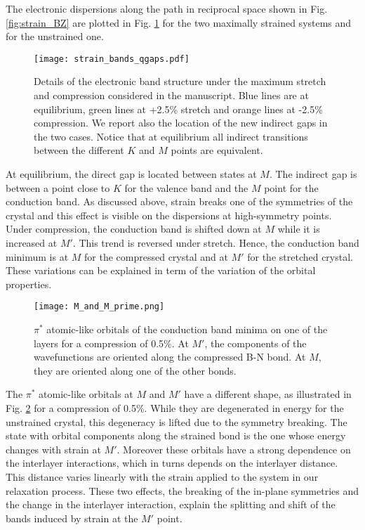 The electronic dispersions along the path in reciprocal space shown in Fig. \ref{fig:strain_BZ} are plotted in Fig. \ref{fig:strain_eldisp} for the two maximally strained systems and for the unstrained one. 
\begin{figure}[tb]
	\vspace{0.5cm}
	\setcapindent{2em}
	\centering
	\texttt{[image: strain\_bands\_qgaps.pdf]}
	\caption{Details of the electronic band structure under the maximum
	stretch and compression considered in the manuscript. Blue lines are at equilibrium, green lines at +2.5\% stretch and orange lines at -2.5\% compression. We report also the location of the new indirect gaps in the two cases. Notice that at equilibrium all indirect transitions between the different $K$ and $M$ points are equivalent.}
	\label{fig:strain_eldisp}
\end{figure}
At equilibrium, the direct gap is located between states at $M$. The indirect gap is between a point close to $K$ for the valence band and the $M$ point for the conduction band. As discussed above, strain breaks one of the symmetries of the crystal and this effect is visible on the dispersions at high-symmetry points. Under compression, the conduction band is shifted down at $M$ while it is increased at $M'$. This trend is reversed under stretch. Hence, the conduction band minimum is at $M$ for the compressed crystal and at $M'$ for the stretched crystal. 
These variations can be explained in term of the variation of the orbital properties. 
\begin{figure}[h!b]
	\vspace{-16pt}
	\setcapindent{1em}
	\centering
	\texttt{[image: M\_and\_M\_prime.png]}
	\caption{$\pi^*$ atomic-like orbitals of the conduction band minima on one of the layers for a compression of 0.5\%. At $M'$, the components of the wavefunctions are oriented along the compressed B-N bond. At $M$, they are oriented along one of the other bonds.}
	\label{fig:WF_strain}
\end{figure}
The $\pi^*$ atomic-like orbitals at $M$ and $M'$ have a different shape, as illustrated in Fig. \ref{fig:WF_strain} for a compression of 0.5\%. While they are degenerated in energy for the unstrained crystal, this degeneracy is lifted due to the symmetry breaking. The state with orbital components along the strained bond is the one whose energy changes with strain at $M'$. Moreover these orbitals have a strong dependence on the interlayer interactions,\cite{kang2016unified} which in turns depends on the interlayer distance. This distance varies linearly with the strain applied to the system in our relaxation process. These two effects, the breaking of the in-plane symmetries and the change in the interlayer interaction, explain the splitting and shift of the bands induced by strain at the $M'$ point.

